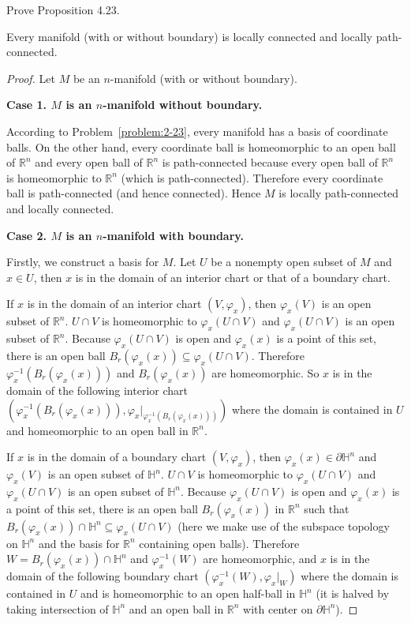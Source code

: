 \begin{exercise}{4.24}\label{exercise:4.24}
	Prove Proposition 4.23.

	Every manifold (with or without boundary) is locally connected and locally path-connected.
\end{exercise}

\begin{proof}
	Let $M$ be an $n$-manifold (with or without boundary).

	\textbf{Case 1. $M$ is an $n$-manifold without boundary.}

	According to Problem~\ref{problem:2-23}, every manifold has a basis of coordinate balls. On the other hand, every coordinate ball is homeomorphic to an open ball of $\mathbb{R}^{n}$ and every open ball of $\mathbb{R}^{n}$ is path-connected because every open ball of $\mathbb{R}^{n}$ is homeomorphic to $\mathbb{R}^{n}$ (which is path-connected). Therefore every coordinate ball is path-connected (and hence connected). Hence $M$ is locally path-connected and locally connected.

	\textbf{Case 2. $M$ is an $n$-manifold with boundary.}

	Firstly, we construct a basis for $M$. Let $U$ be a nonempty open subset of $M$ and $x\in U$, then $x$ is in the domain of an interior chart or that of a boundary chart.

	If $x$ is in the domain of an interior chart $(V, \varphi_{x})$, then $\varphi_{x}(V)$ is an open subset of $\mathbb{R}^{n}$. $U\cap V$ is homeomorphic to $\varphi_{x}(U\cap V)$ and $\varphi_{x}(U\cap V)$ is an open subset of $\mathbb{R}^{n}$. Because $\varphi_{x}(U\cap V)$ is open and $\varphi_{x}(x)$ is a point of this set, there is an open ball $B_{r}(\varphi_{x}(x)) \subseteq \varphi_{x}(U\cap V)$. Therefore $\varphi_{x}^{-1}(B_{r}(\varphi_{x}(x)))$ and $B_{r}(\varphi_{x}(x))$ are homeomorphic. So $x$ is in the domain of the following interior chart $(\varphi_{x}^{-1}(B_{r}(\varphi_{x}(x))), \varphi_{x}\vert_{\varphi_{x}^{-1}(B_{r}(\varphi_{x}(x)))})$ where the domain is contained in $U$ and homeomorphic to an open ball in $\mathbb{R}^{n}$.

	If $x$ is in the domain of a boundary chart $(V, \varphi_{x})$, then $\varphi_{x}(x) \in \partial\mathbb{H}^{n}$ and $\varphi_{x}(V)$ is an open subset of $\mathbb{H}^{n}$. $U\cap V$ is homeomorphic to $\varphi_{x}(U\cap V)$ and $\varphi_{x}(U\cap V)$ is an open subset of $\mathbb{H}^{n}$. Because $\varphi_{x}(U\cap V)$ is open and $\varphi_{x}(x)$ is a point of this set, there is an open ball $B_{r}(\varphi_{x}(x))$ in $\mathbb{R}^{n}$ such that $B_{r}(\varphi_{x}(x)) \cap \mathbb{H}^{n} \subseteq \varphi_{x}(U\cap V)$ (here we make use of the subspace topology on $\mathbb{H}^{n}$ and the basis for $\mathbb{R}^{n}$ containing open balls). Therefore $W = B_{r}(\varphi_{x}(x)) \cap \mathbb{H}^{n}$ and $\varphi_{x}^{-1}(W)$ are homeomorphic, and $x$ is in the domain of the following boundary chart $(\varphi_{x}^{-1}(W), \varphi_{x}\vert_{W})$ where the domain is contained in $U$ and is homeomorphic to an open half-ball in $\mathbb{H}^{n}$ (it is halved by taking intersection of $\mathbb{H}^{n}$ and an open ball in $\mathbb{R}^{n}$ with center on $\partial \mathbb{H}^{n}$).


\end{proof}

